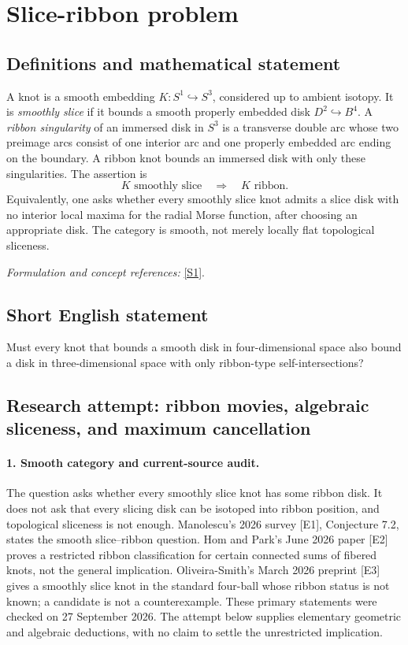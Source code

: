 \documentclass[11pt]{article}
\begin{document}
\section*{\texorpdfstring{Slice-ribbon problem}{Slice-ribbon problem}}\label{statement}
\subsection{Definitions and mathematical statement}
A knot is a smooth embedding $K:S^1\hookrightarrow S^3$, considered up to ambient isotopy. It is \emph{smoothly slice} if it bounds a smooth properly embedded disk $D^2\hookrightarrow B^4$. A \emph{ribbon singularity} of an immersed disk in $S^3$ is a transverse double arc whose two preimage arcs consist of one interior arc and one properly embedded arc ending on the boundary. A ribbon knot bounds an immersed disk with only these singularities. The assertion is
\[
 K\text{ smoothly slice}\quad\Longrightarrow\quad K\text{ ribbon}.
\]
Equivalently, one asks whether every smoothly slice knot admits a slice disk with no interior local maxima for the radial Morse function, after choosing an appropriate disk. The category is smooth, not merely locally flat topological sliceness.
\par\smallskip\textit{Formulation and concept references:} \href{https://www.openproblemgarden.org/op/slice_ribbon_problem_0}{[S1]}.

\subsection{Short English statement}
Must every knot that bounds a smooth disk in four-dimensional space also bound a disk in three-dimensional space with only ribbon-type self-intersections?
\subsection{Research attempt: ribbon movies, algebraic sliceness, and maximum cancellation}
\paragraph{1. Smooth category and current-source audit.}
The question asks whether every smoothly slice knot has some ribbon disk. It does not ask that every slicing disk can be isotoped into ribbon position, and topological sliceness is not enough. Manolescu's 2026 survey [E1], Conjecture 7.2, states the smooth slice--ribbon question. Hom and Park's June 2026 paper [E2] proves a restricted ribbon classification for certain connected sums of fibered knots, not the general implication. Oliveira-Smith's March 2026 preprint [E3] gives a smoothly slice knot in the standard four-ball whose ribbon status is not known; a candidate is not a counterexample. These primary statements were checked on 27 September 2026. The attempt below supplies elementary geometric and algebraic deductions, with no claim to settle the unrestricted implication.
\end{document}
